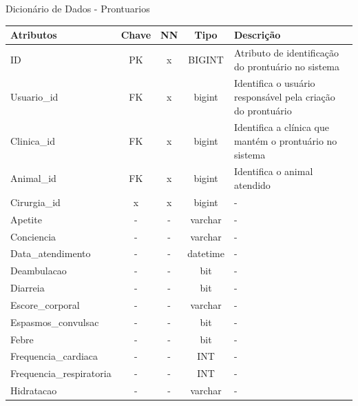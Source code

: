\documentclass[
    12pt,               %
    openright,          %
    oneside,
    a4paper,            %
    BIBLATEX,           %
    TODO,               %
    english,            %
    brazil              %
    ]{ifsp-spo-inf-ctds}
\begin{document}
            \begin{center}
                \begin{quadro}[H]
              
                  \caption{Dicionário de Dados - Prontuarios}
                  \begin{tabulary}{1.0\textwidth}{|p{9em}|c|c|c|p{19em}|}
                  \hline
                  Atributos & Chave & NN & Tipo & Descrição\\
                  \hline
                  ID & PK & x & BIGINT & Atributo de identificação do prontuário no sistema \\
                  \hline
                  Usuario\_id & FK & x & bigint & Identifica o usuário responsável pela criação do prontuário \\
                  \hline
                  Clinica\_id & FK & x & bigint & Identifica a clínica que mantém o prontuário no sistema\\
                  \hline
                  Animal\_id & FK & x & bigint & Identifica o animal atendido \\
                  \hline
                  Cirurgia\_id & x & x & bigint & -\\
                  \hline
                  Apetite & - & - & varchar & -\\
                  \hline
                  Conciencia & - & - & varchar & -\\
                  \hline
                  Data\_atendimento & - & - & datetime & -\\
                  \hline
                  Deambulacao & - & - & bit & -\\
                  \hline
                  Diarreia & - & - & bit & -\\
                  \hline
                  Escore\_corporal & - & - & varchar & -\\
                  \hline
                  Espasmos\_convulsac & - & - & bit & -\\
                  \hline
                  Febre & - & - & bit & -\\
                  \hline
                  Frequencia\_cardiaca & - & - & INT & -\\
                  \hline
                  Frequencia\_respiratoria & - & - & INT & -\\
                  \hline
                  Hidratacao & - & - & varchar & -\\
                  \hline

\end{tabulary}
\end{quadro}
\end{center}
\end{document}
